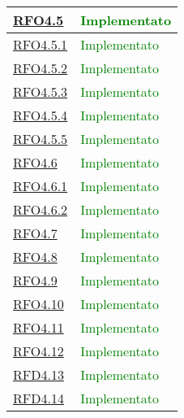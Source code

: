 \begin{longtable}{|>{\centering}m{5cm}|m{5cm}<{\centering}|}
\hyperlink{RFO4.5}{RFO4.5} &  \textcolor{green}{Implementato}\\ \hline

\hyperlink{RFO4.5.1}{RFO4.5.1} & \textcolor{green}{Implementato}\\ \hline

\hyperlink{RFO4.5.2}{RFO4.5.2} & \textcolor{green}{Implementato}\\ \hline

\hyperlink{RFO4.5.3}{RFO4.5.3} &  \textcolor{green}{Implementato}\\ \hline

\hyperlink{RFO4.5.4}{RFO4.5.4} & \textcolor{green}{Implementato}\\ \hline

\hyperlink{RFO4.5.5}{RFO4.5.5} & \textcolor{green}{Implementato}\\ \hline

\hyperlink{RFO4.6}{RFO4.6} & \textcolor{green}{Implementato}\\ \hline

\hyperlink{RFO4.6.1}{RFO4.6.1} &  \textcolor{green}{Implementato}\\ \hline

\hyperlink{RFO4.6.2}{RFO4.6.2} &  \textcolor{green}{Implementato}\\ \hline

\hyperlink{RFO4.7}{RFO4.7} & \textcolor{green}{Implementato}\\ \hline

\hyperlink{RFO4.8}{RFO4.8} &  \textcolor{green}{Implementato}\\ \hline

\hyperlink{RFO4.9}{RFO4.9} &  \textcolor{green}{Implementato}\\ \hline

\hyperlink{RFO4.10}{RFO4.10} & \textcolor{green}{Implementato}\\ \hline

\hyperlink{RFO4.11}{RFO4.11} &  \textcolor{green}{Implementato}\\ \hline

\hyperlink{RFO4.12}{RFO4.12} &  \textcolor{green}{Implementato}\\ \hline

\hyperlink{RFD4.13}{RFD4.13} & \textcolor{green}{Implementato}\\ \hline

\hyperlink{RFD4.14}{RFD4.14} & \textcolor{green}{Implementato}\\ \hline


\end{longtable}
